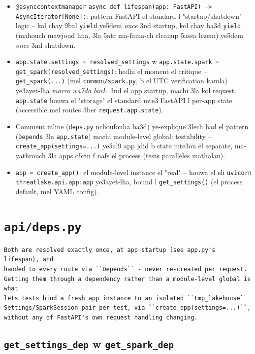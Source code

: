 \documentclass[11pt,a4paper]{report}
\DeclareRobustCommand{\code}[1]{\texttt{#1}}
\DeclareRobustCommand{\file}[1]{\texttt{\color{amber}#1}}
\begin{document}
\begin{itemize}
  \item \code{@asynccontextmanager} \code{async def lifespan(app:
        FastAPI) -> AsyncIterator[None]:}: pattern FastAPI el standard
        l "startup/shutdown" logic -- kol chay 9bal \code{yield} ye5dem
        \emph{once} 3nd startup, kol chay ba3d \code{yield} (mahouch
        mawjoud hna, 3la 5atr ma-fama-ch cleanup 5assa lezem) ye5dem
        \emph{once} 3nd shutdown.
  \item \code{app.state.settings = resolved\_settings} w \code{app.state.spark
        = get\_spark(resolved\_settings)}: hedhi el moment el critique --
        \code{get\_spark(...)} (mel \code{common/spark.py}, b el UTC
        verification kamla) ye3ayet-lha \emph{marra wa7da bark}, 3nd
        el app startup, machi 3la kol request. \code{app.state} houwa
        el "storage" el standard mte3 FastAPI l per-app state (accessible
        mel routes 3ber \code{request.app.state}).
  \item Comment inline (\code{deps.py} nchoufouha ba3d) ye-explique
        3lech had el pattern (\code{Depends} 3la \code{app.state}) machi
        module-level global: testability -- \code{create\_app(settings=...)}
        ye5al9 app jdid b state mte3ou el separate, ma-yathrouch 3la
        apps o5rin f nafs el process (tests parallèles mathalan).
  \item \code{app = create\_app()}: el module-level instance el "real"
        -- houwa el eli \code{uvicorn threatlake.api.app:app} ye3ayet-lha,
        bound l \code{get\_settings()} (el process default, mel YAML config).
\end{itemize}

\section{\file{api/deps.py}}

\begin{lstlisting}[style=pystyle]
Both are resolved exactly once, at app startup (see app.py's lifespan), and
handed to every route via ``Depends`` - never re-created per request.
Getting them through a dependency rather than a module-level global is what
lets tests bind a fresh app instance to an isolated ``tmp_lakehouse``
Settings/SparkSession pair per test, via ``create_app(settings=...)``,
without any of FastAPI's own request handling changing.
\end{lstlisting}

\subsection{\code{get\_settings\_dep} w \code{get\_spark\_dep}}
\end{document}
